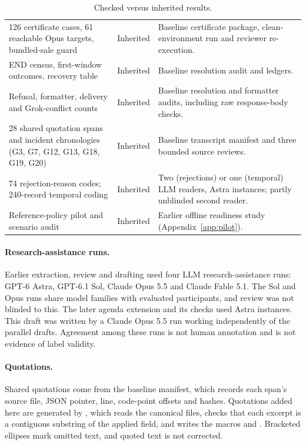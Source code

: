 \begin{table}[htbp]
\begin{tabularx}{\linewidth}{@{}L{4.2cm}L{2.0cm}Y@{}}
126 certificate cases, 61 reachable Opus targets, bundled-sale guard & Inherited & Baseline certificate package, clean-environment run and reviewer re-execution.\\
END census, first-window outcomes, recovery table & Inherited & Baseline resolution audit and ledgers.\\
Refusal, formatter, delivery and Grok-conflict counts & Inherited & Baseline resolution and formatter audits, including raw response-body checks.\\
28 shared quotation spans and incident chronologies (G3, G7, G12, G13, G18, G19, G20) & Inherited & Baseline transcript manifest and three bounded source reviews.\\
74 rejection-reason codes; 240-record temporal coding & Inherited & Two (rejections) or one (temporal) LLM readers, Astra instances; partly unblinded second reader.\\
Reference-policy pilot and scenario audit & Inherited & Earlier offline readiness study (Appendix~\ref{app:pilot}).\\
\bottomrule
\end{tabularx}
\caption{Checked versus inherited results.}
\label{tab:provenance}
\end{table}

\paragraph{Research-assistance runs.} Earlier extraction, review and drafting used four LLM research-assistance runs: GPT-6 Astra, GPT-6.1 Sol, Claude Opus 5.5 and Claude Fable 5.1. The Sol and Opus runs share model families with evaluated participants, and review was not blinded to this. The later agenda extension and its checks used Astra instances. This draft was written by a Claude Opus 5.5 run working independently of the parallel drafts. Agreement among these runs is not human annotation and is not evidence of label validity.

\paragraph{Quotations.} Shared quotations come from the baseline manifest, which records each span's source file, JSON pointer, line, code-point offsets and hashes. Quotations added here are generated by , which reads the canonical files, checks that each excerpt is a contiguous substring of the applied field, and writes the macros and . Bracketed ellipses mark omitted text, and quoted text is not corrected.

